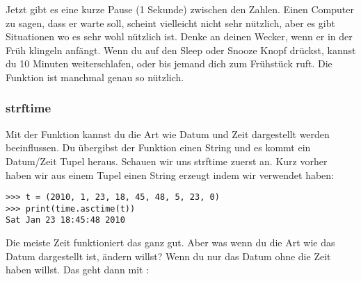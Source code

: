 \noindent
Jetzt gibt es eine kurze Pause (1 Sekunde) zwischen den Zahlen. Einen Computer zu sagen, dass er warte soll, scheint vielleicht nicht sehr nützlich, aber es gibt Situationen wo es sehr wohl nützlich ist.  Denke an deinen Wecker, wenn er in der Früh klingeln anfängt. Wenn du auf den Sleep oder Snooze Knopf drückst, kannst du 10 Minuten weiterschlafen, oder bis jemand dich zum Frühstück ruft. Die  Funktion ist manchmal genau so nützlich.

\subsubsection*{strftime}
Mit der  Funktion kannst du die Art wie Datum und Zeit dargestellt werden beeinflussen. Du übergibst der  Funktion einen String und es kommt ein Datum/Zeit Tupel heraus. Schauen wir uns strftime zuerst an. Kurz vorher haben wir aus einem Tupel einen String erzeugt indem wir  verwendet haben:

\begin{Verbatim}[frame=single]
>>> t = (2010, 1, 23, 18, 45, 48, 5, 23, 0)
>>> print(time.asctime(t))
Sat Jan 23 18:45:48 2010
\end{Verbatim}

\noindent
Die meiste Zeit funktioniert das ganz gut. Aber was wenn du die Art wie das Datum dargestellt ist, ändern willst? Wenn du nur das Datum ohne die Zeit haben willst. Das geht dann mit :

